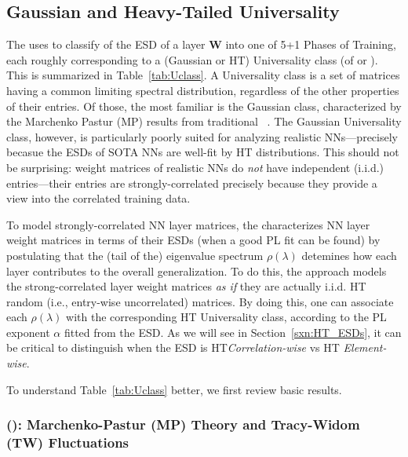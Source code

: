 
\subsection{Gaussian and Heavy-Tailed Universality}
\label{sxn:guass_ht_univ}

The \HTSR \Phenomenology uses \RMT to classify of the ESD of a layer $\mathbf{W}$ into one of 5+1 Phases of Training, 
each roughly corresponding to a (Gaussian or HT) Universality class (of \RMT or \HTRMT).
This is summarized in Table~\ref{tab:Uclass}. 
A Universality class is a set of matrices having a common limiting spectral distribution, regardless of the other properties of their entries. 
Of those, the most familiar is the Gaussian class, characterized by the Marchenko Pastur (MP) results from traditional \RMT~\cite{EW13,potters_bouchaud_2020}. 
The Gaussian Universality class, however, is particularly poorly suited for analyzing realistic NNs---precisely becasue the ESDs of SOTA NNs are well-fit by HT distributions.
This should not be surprising: weight matrices of realistic NNs do \emph{not} have independent (i.i.d.)
entries---their entries are strongly-correlated precisely because they provide a view into the correlated training data.

To model strongly-correlated NN layer matrices, the \HTSR \Phenomenology characterizes NN layer weight matrices
in terms of their ESDs (when a good PL fit can be found) by postulating that the (tail of the) eigenvalue spectrum $\rho(\lambda)$ 
detemines how each layer contributes to the overall generalization.  
To do this, the \HTSR approach models the strong-correlated layer weight matrices \emph{as if} they are actually i.i.d. HT random
(i.e., entry-wise uncorrelated) matrices. 
By doing this, one can  associate each $\rho(\lambda)$ with 
the corresponding HT Universality class, according to the PL exponent $\alpha$ fitted from the ESD. 
As we will see in 
Section~\ref{sxn:HT_ESDs}, it can be critical to distinguish  when the ESD is HT\emph{Correlation-wise} vs HT \emph{Element-wise}.

To understand Table~\ref{tab:Uclass} better, we first review basic results.  %


\subsubsection{\RandomMatrixTheory (\RMT):  Marchenko-Pastur (MP) Theory and Tracy-Widom (TW) Fluctuations}

